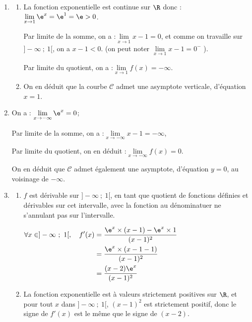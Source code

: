 \medskip

\begin{enumerate}
\item \begin{enumerate}
		\item La fonction exponentielle est continue sur $\R$ donc :\quad $\lim\limits_{x \to 1} \e^{x} = \e^1 = \e >0$.

		Par limite de la somme, on a :\quad $\lim\limits_{x \to 1} x - 1 = 0$, et comme on travaille sur $]-\infty~;~ 1[ $, on a $x - 1 < 0$. (on peut noter $\lim\limits_{x \to 1} x - 1 = 0^-$ ).

		Par limite du quotient, on a :\quad $\lim\limits_{x \to 1} f(x) = -\infty$.

		\item On en déduit que la courbe $ \mathcal{C} $ admet une asymptote verticale, d'équation $x = 1$.

	\end{enumerate}
	\item On a : \quad $\lim\limits_{x \to -\infty} \e^x = 0$;

	Par limite de la somme, on a :\quad $\lim\limits_{x \to -\infty} x - 1 =-\infty$,

	Par limite du quotient, on en déduit :\quad $\lim\limits_{x \to -\infty} f(x) = 0$.

	On en déduit que $ \mathcal{C} $ admet également une asymptote, d'équation $y = 0$, au voisinage de $ -\infty $.

\item \begin{enumerate}
		\item $f$ est dérivable sur $ ]-\infty ~;~ 1[ $, en tant que quotient de fonctions définies et dérivables sur cet intervalle, avec la fonction au dénominatuer ne s'annulant pas sur l'intervalle.

		$\begin{aligned}[t] \forall x \in ]-\infty~;~1[ ,\quad f'(x) & = \dfrac{\e^x \times (x - 1) - \e^x \times 1}{(x-1)^2 }\\
		&= \dfrac{\e^x \times (x - 1 - 1)}{(x-1)^2}\\
		&= \dfrac{(x - 2)\e^x}{(x - 1)^2}\\ \end{aligned}$

		\item La fonction exponentielle est à valeurs strictement positives sur $\R$, et pour tout $x$ dans $ ]-\infty ~;~ 1[ $, $(x - 1)^2$ est strictement positif, donc le signe de $f'(x)$ est le même que le signe de $(x - 2)$.


\end{enumerate}
\end{enumerate}
